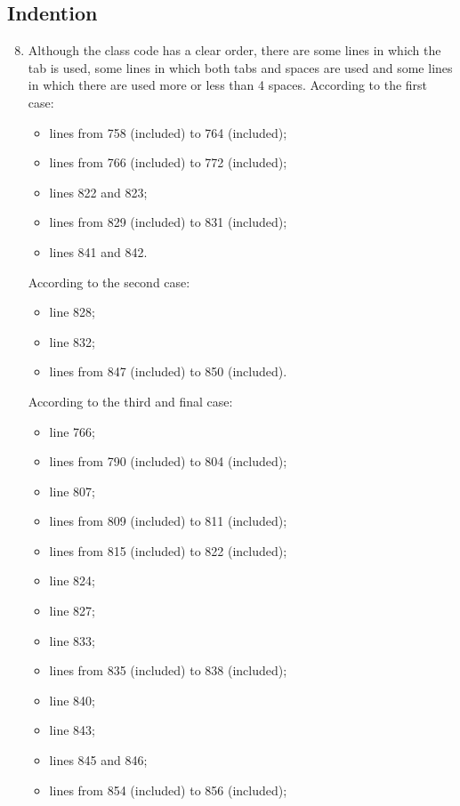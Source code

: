 \subsection{Indention}
\begin{enumerate}
	\setcounter{enumi}{7}
	\item Although the class code has a clear order, there are some lines in which the tab is used, some lines in which both tabs and spaces are used and some lines in which there are used more or less than 4 spaces. According to the first case:
	    \begin{itemize}
	        \item lines from 758 (included) to 764 (included);
	        \item lines from 766 (included) to 772 (included);
	        \item lines 822 and 823;
	        \item lines from 829 (included) to 831 (included);
	        \item lines 841 and 842.
	    \end{itemize}
	According to the second case:
	    \begin{itemize}
	        \item line 828;
	        \item line 832;
	        \item lines from 847 (included) to 850 (included).
	    \end{itemize}
	According to the third and final case:
	    \begin{itemize}
	        \item line 766;
	        \item lines from 790 (included) to 804 (included);
	        \item line 807;
	        \item lines from 809 (included) to 811 (included);
	        \item lines from 815 (included) to 822 (included);
	        \item line 824;
	        \item line 827;
		    \item line 833;
		    \item lines from 835 (included) to 838 (included);
		    \item line 840;
		    \item line 843;
		    \item lines 845 and 846;
		    \item lines from 854 (included) to 856 (included);

\end{itemize}
\end{enumerate}
